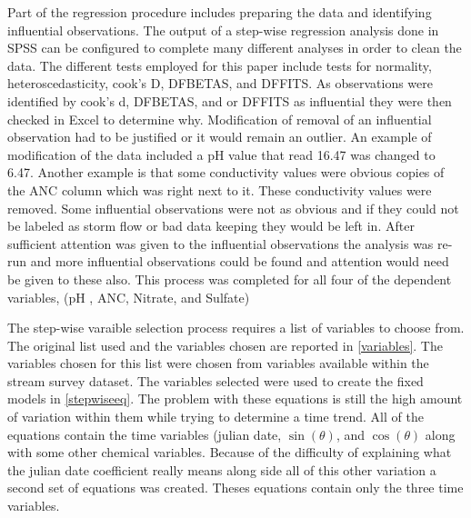  Part of the regression procedure includes preparing the data and  identifying influential observations.  The output of a step-wise regression analysis done in SPSS can be configured to complete many different analyses in order to clean the data.  The different tests employed for this paper include tests for normality, heteroscedasticity, cook's D, DFBETAS, and DFFITS.  As observations were identified by cook's d, DFBETAS, and or DFFITS as influential they were then checked in Excel to determine why.  Modification of removal of an influential observation had to be justified or it would remain an outlier.  An example of modification of the data included a pH value that read 16.47 was changed to 6.47.  Another example is that some conductivity values were obvious copies of the ANC column which was right next to it.  These conductivity values were removed.   Some influential observations were not as obvious and if they could not be labeled as storm flow or bad data keeping they would be left in.  After sufficient attention was given to the influential observations the analysis was re-run and more influential observations could be found and attention would need be given to these also.  This process was completed for all four of the dependent variables, (pH , ANC, Nitrate, and Sulfate)
 
 The step-wise varaible selection process requires a list of variables to choose from.  The original list used and the variables chosen are reported in \autoref{variables}.  The variables chosen for this list were chosen from variables available within the stream survey dataset.   The variables selected were used to create the fixed models in \autoref{stepwiseeq}. 
 The problem with these equations is still the high amount of variation within them while trying to determine a time trend.  All of the equations contain the time variables (julian date, $\sin(\theta)$, and $\cos(\theta)$ along with some other chemical variables.  Because of the difficulty of explaining what the julian date coefficient really means along side all of this other variation a second set of equations was created.  Theses equations contain only the three time variables.
 
